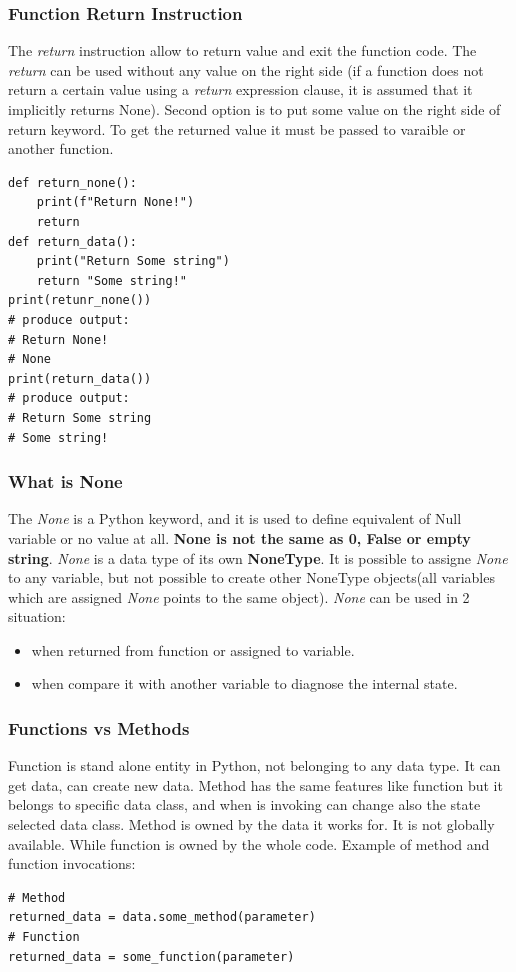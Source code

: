 \documentclass{article}
\begin{document}
	\subsubsection{Function Return Instruction}
	The \textit{return} instruction allow to return value and exit the function code. The \textit{return} can be used without any value on the right side (if a function does not return a certain value using a \textit{return} expression clause, it is assumed that it implicitly returns None). Second option is to put some value on the right side of return keyword. To get the returned value it must be passed to varaible or another function.
	\begin{lstlisting}[style=pystyle]
def return_none():
	print(f"Return None!")
	return
def return_data():
	print("Return Some string")
	return "Some string!"
print(retunr_none())
# produce output:
# Return None!
# None
print(return_data())
# produce output:
# Return Some string
# Some string!
	\end{lstlisting}
	
	\subsubsection{What is None}
	The \textit{None} is a Python keyword, and it is used to define equivalent of Null variable or no value at all. \textbf{None is not the same as 0, False or empty string}. \textit{None} is a data type of its own \textbf{NoneType}. It is possible to assigne \textit{None} to any variable, but not possible to create other NoneType objects(all variables which are assigned \textit{None} points to the same object). \textit{None} can be used in 2 situation:
	\begin{itemize}
	\item when returned from function or assigned to variable.
	\item when compare it with another variable to diagnose the internal state.
	\end{itemize}
	
	\subsubsection{Functions vs Methods}
	Function is stand alone entity in Python, not belonging to any data type. It can get data, can create new data. Method has the same features like function but it belongs to specific data class, and when is invoking can change also the state selected data class.
	Method is owned by the data it works for. It is not globally available. While function is owned by the whole code. Example of method and function invocations:
	\begin{lstlisting}[style=pystyle]
# Method
returned_data = data.some_method(parameter)
# Function
returned_data = some_function(parameter)
	\end{lstlisting}
	
\end{document}
